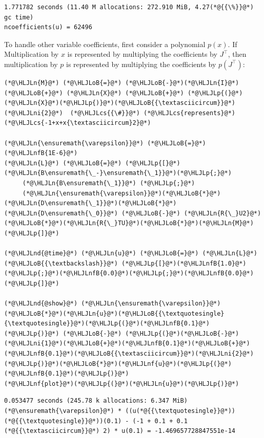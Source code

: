 \documentclass[12pt,a4paper]{article}
\newcommand{\HLJLn}[1]{#1}
\newcommand{\HLJLnd}[1]{\textcolor[RGB]{214,102,97}{#1}}
\newcommand{\HLJLnf}[1]{\textcolor[RGB]{66,102,213}{#1}}
\newcommand{\HLJLnfB}[1]{\textcolor[RGB]{59,151,46}{#1}}
\newcommand{\HLJLni}[1]{\textcolor[RGB]{59,151,46}{#1}}
\newcommand{\HLJLoB}[1]{\textcolor[RGB]{102,102,102}{\textbf{#1}}}
\newcommand{\HLJLp}[1]{#1}
\newcommand{\HLJLcs}[1]{\textcolor[RGB]{153,153,119}{\textit{#1}}}
\begin{document}
\begin{lstlisting}
1.771782 seconds (11.40 M allocations: 272.910 MiB, 4.27(*@{{\%}}@*) gc time)
ncoefficients(u) = 62496
\end{lstlisting}


To handle other variable coefficients, first consider a polynomial $p(x)$. If Multiplication by $x$ is represented by multiplying the coefficients by $J^\top$, then multiplication by $p$ is represented by multiplying the coefficients by $p(J^\top)$:


\begin{lstlisting}
(*@\HLJLn{M}@*) (*@\HLJLoB{=}@*) (*@\HLJLoB{-}@*)(*@\HLJLn{I}@*) (*@\HLJLoB{+}@*) (*@\HLJLn{X}@*) (*@\HLJLoB{+}@*) (*@\HLJLp{(}@*)(*@\HLJLn{X}@*)(*@\HLJLp{)}@*)(*@\HLJLoB{{\textasciicircum}}@*)(*@\HLJLni{2}@*)  (*@\HLJLcs{{\#}}@*) (*@\HLJLcs{represents}@*) (*@\HLJLcs{-1+x+x{\textasciicircum}2}@*)

(*@\HLJLn{\ensuremath{\varepsilon}}@*) (*@\HLJLoB{=}@*) (*@\HLJLnfB{1E-6}@*)
(*@\HLJLn{L}@*) (*@\HLJLoB{=}@*) (*@\HLJLp{[}@*)(*@\HLJLn{B\ensuremath{\_-}\ensuremath{\_1}}@*)(*@\HLJLp{;}@*)
     (*@\HLJLn{B\ensuremath{\_1}}@*) (*@\HLJLp{;}@*)
     (*@\HLJLn{\ensuremath{\varepsilon}}@*)(*@\HLJLoB{*}@*)(*@\HLJLn{D\ensuremath{\_1}}@*)(*@\HLJLoB{*}@*)(*@\HLJLn{D\ensuremath{\_0}}@*) (*@\HLJLoB{-}@*) (*@\HLJLn{R{\_}U2}@*)(*@\HLJLoB{*}@*)(*@\HLJLn{R{\_}TU}@*)(*@\HLJLoB{*}@*)(*@\HLJLn{M}@*)(*@\HLJLp{]}@*)

(*@\HLJLnd{@time}@*) (*@\HLJLn{u}@*) (*@\HLJLoB{=}@*) (*@\HLJLn{L}@*) (*@\HLJLoB{{\textbackslash}}@*) (*@\HLJLp{[}@*)(*@\HLJLnfB{1.0}@*)(*@\HLJLp{;}@*)(*@\HLJLnfB{0.0}@*)(*@\HLJLp{;}@*)(*@\HLJLnfB{0.0}@*)(*@\HLJLp{]}@*)

(*@\HLJLnd{@show}@*) (*@\HLJLn{\ensuremath{\varepsilon}}@*)(*@\HLJLoB{*}@*)(*@\HLJLn{u}@*)(*@\HLJLoB{{\textquotesingle}{\textquotesingle}}@*)(*@\HLJLp{(}@*)(*@\HLJLnfB{0.1}@*)(*@\HLJLp{)}@*) (*@\HLJLoB{-}@*) (*@\HLJLp{(}@*)(*@\HLJLoB{-}@*)(*@\HLJLni{1}@*)(*@\HLJLoB{+}@*)(*@\HLJLnfB{0.1}@*)(*@\HLJLoB{+}@*)(*@\HLJLnfB{0.1}@*)(*@\HLJLoB{{\textasciicircum}}@*)(*@\HLJLni{2}@*)(*@\HLJLp{)}@*)(*@\HLJLoB{*}@*)(*@\HLJLnf{u}@*)(*@\HLJLp{(}@*)(*@\HLJLnfB{0.1}@*)(*@\HLJLp{)}@*)
(*@\HLJLnf{plot}@*)(*@\HLJLp{(}@*)(*@\HLJLn{u}@*)(*@\HLJLp{)}@*)
\end{lstlisting}

\begin{lstlisting}
0.053477 seconds (245.78 k allocations: 6.347 MiB)
(*@\ensuremath{\varepsilon}@*) * ((u(*@{{\textquotesingle}}@*))(*@{{\textquotesingle}}@*))(0.1) - (-1 + 0.1 + 0.1 (*@{{\textasciicircum}}@*) 2) * u(0.1) = -1.469657728847551e-14
\end{lstlisting}
\end{document}

